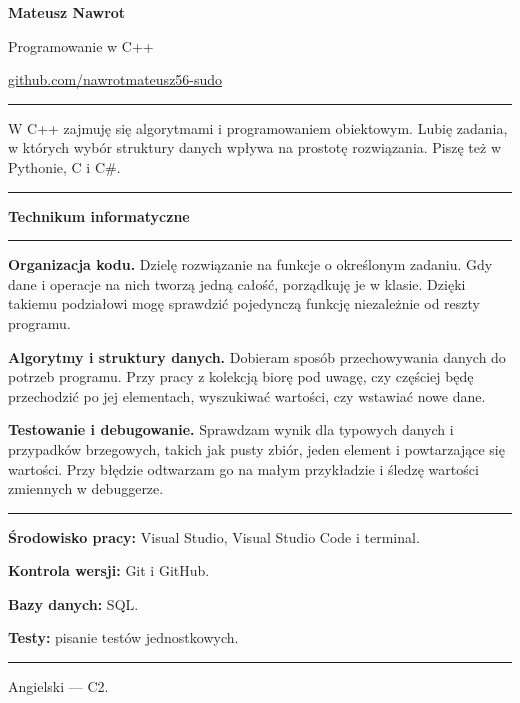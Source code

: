 \documentclass[11pt,a4paper]{article}
\newcommand{\dzial}[1]{\par\vspace{8pt}{\large\bfseries #1}\par\vspace{1pt}\hrule\vspace{4pt}}
\begin{document}
{\LARGE\bfseries Mateusz Nawrot}\par
Programowanie w C++\par
\href{https://github.com/nawrotmateusz56-sudo}{github.com/nawrotmateusz56-sudo}

\dzial{Profil}
W C++ zajmuję się algorytmami i programowaniem obiektowym. Lubię zadania,
w których wybór struktury danych wpływa na prostotę rozwiązania.
Piszę też w Pythonie, C i C\#.

\dzial{Wykształcenie}
\textbf{Technikum informatyczne}

\dzial{Programowanie w C++}
\textbf{Organizacja kodu.}
Dzielę rozwiązanie na funkcje o określonym zadaniu. Gdy dane i operacje
na nich tworzą jedną całość, porządkuję je w klasie. Dzięki takiemu podziałowi
mogę sprawdzić pojedynczą funkcję niezależnie od reszty programu.\par
\textbf{Algorytmy i struktury danych.}
Dobieram sposób przechowywania danych do potrzeb programu. Przy pracy
z kolekcją biorę pod uwagę, czy częściej będę przechodzić po jej elementach,
wyszukiwać wartości, czy wstawiać nowe dane.\par
\textbf{Testowanie i debugowanie.}
Sprawdzam wynik dla typowych danych i przypadków brzegowych, takich jak
pusty zbiór, jeden element i powtarzające się wartości. Przy błędzie
odtwarzam go na małym przykładzie i śledzę wartości zmiennych w debuggerze.

\dzial{Narzędzia i pozostałe umiejętności}
\textbf{Środowisko pracy:} Visual Studio, Visual Studio Code i terminal.\par
\textbf{Kontrola wersji:} Git i GitHub.\par
\textbf{Bazy danych:} SQL.\par
\textbf{Testy:} pisanie testów jednostkowych.

\dzial{Języki obce}
Angielski — C2.
\end{document}
